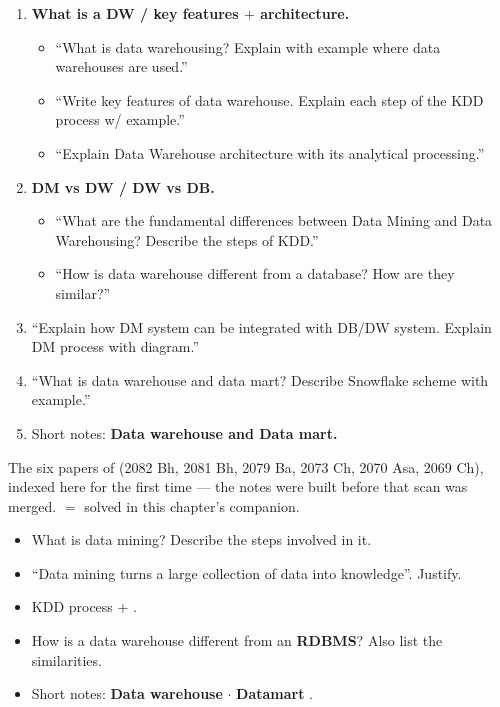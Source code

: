 \begin{enumerate}[start=3]
  \item {} \textbf{What is a DW / key features $+$ architecture.}
  \begin{itemize}
    \item ``What is data warehousing? Explain with example where data warehouses are used.'' \hfill {} 
    \item ``Write key features of data warehouse. Explain each step of the KDD process w/ example.'' \hfill {} 
    \item ``Explain Data Warehouse architecture with its analytical processing.'' \hfill {} 
  \end{itemize}
  \item {} \textbf{DM vs DW / DW vs DB.}
  \begin{itemize}
    \item ``What are the fundamental differences between Data Mining and Data Warehousing? Describe the steps of KDD.'' \hfill {} 
    \item ``How is data warehouse different from a database? How are they similar?'' \hfill {} 
  \end{itemize}
  \item {} ``Explain how DM system can be integrated with DB/DW system. Explain DM process with diagram.'' \hfill {} 
  \item {} ``What is data warehouse and data mart? Describe Snowflake scheme with example.'' \hfill {} 
  \item {} Short notes: \textbf{Data warehouse and Data mart.} \hfill {} 
\end{enumerate}

{\color{sub}\footnotesize The six papers of  (2082 Bh, 2081 Bh, 2079 Ba, 2073 Ch, 2070 Asa, 2069 Ch), indexed here for the
first time --- the notes were built before that scan was merged.  $=$ solved in this chapter's companion. \added}
\begin{itemize}
  \item What is data mining? Describe the steps involved in it. \hfill {} 
  \item ``Data mining turns a large collection of data into knowledge''. Justify. \hfill {}  \added
  \item KDD process $+$ . \hfill {} 
  \item How is a data warehouse different from an \textbf{RDBMS}? Also list the similarities. \hfill {} 
  \item Short notes: \textbf{Data warehouse}  $\cdot$ \textbf{Datamart} . \hfill {}
\end{itemize}

